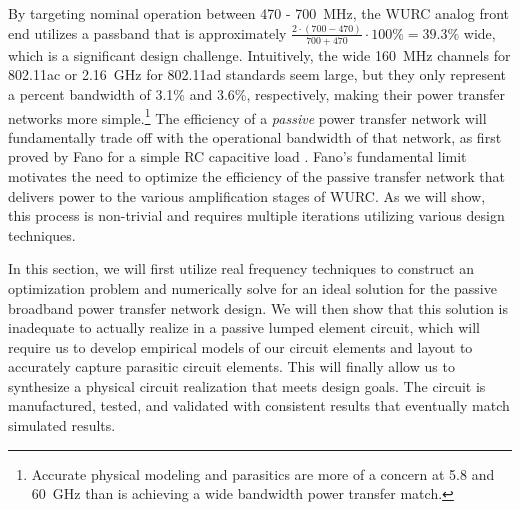 	By targeting nominal operation between 470 - 700~MHz, the \ac{WURC} analog front end utilizes a passband that is approximately $\frac{2\cdot(700-470)}{700+470}\cdot 100\% = 39.3\%$ wide, which is a significant design challenge.
	Intuitively, the wide 160~MHz channels for 802.11ac or 2.16~GHz for 802.11ad standards seem large, but they only represent a percent bandwidth of 3.1\% and 3.6\%, respectively, making their power transfer networks more simple.\footnote{Accurate physical modeling and parasitics are more of a concern at 5.8 and 60~GHz than is achieving a wide bandwidth power transfer match.}
	The efficiency of a \emph{passive} power transfer network will fundamentally trade off with the operational bandwidth of that network, as first proved by Fano for a simple RC capacitive load \cite{fano1950theoretical}.
	Fano's fundamental limit motivates the need to optimize the efficiency of the passive transfer network that delivers power to the various amplification stages of \ac{WURC}.
	As we will show, this process is non-trivial and requires multiple iterations utilizing various design techniques.

	In this section, we will first utilize real frequency techniques to construct an optimization problem and numerically solve for an ideal solution for the passive broadband power transfer network design.
	We will then show that this solution is inadequate to actually realize in a passive lumped element circuit, which will require us to develop empirical models of our circuit elements and layout to accurately capture parasitic circuit elements.
	This will finally allow us to synthesize a physical circuit realization that meets design goals.
	The circuit is manufactured, tested, and validated with consistent results that eventually match simulated results.

%
%
%
%
%
%

